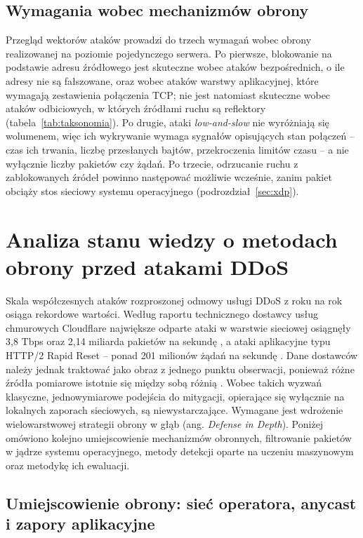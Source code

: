 \documentclass[a4paper,12pt]{article}
\begin{document}
\subsection{Wymagania wobec mechanizmów obrony}
Przegląd wektorów ataków prowadzi do trzech wymagań wobec obrony realizowanej na poziomie pojedynczego serwera. Po pierwsze, blokowanie na podstawie adresu źródłowego jest skuteczne wobec ataków bezpośrednich, o ile adresy nie są fałszowane, oraz wobec ataków warstwy aplikacyjnej, które wymagają zestawienia połączenia TCP; nie jest natomiast skuteczne wobec ataków odbiciowych, w których źródłami ruchu są reflektory (tabela~\ref{tab:taksonomia}). Po drugie, ataki \textit{low-and-slow} nie wyróżniają się wolumenem, więc ich wykrywanie wymaga sygnałów opisujących stan połączeń -- czas ich trwania, liczbę przesłanych bajtów, przekroczenia limitów czasu -- a nie wyłącznie liczby pakietów czy żądań. Po trzecie, odrzucanie ruchu z zablokowanych źródeł powinno następować możliwie wcześnie, zanim pakiet obciąży stos sieciowy systemu operacyjnego (podrozdział~\ref{sec:xdp}).

\section{Analiza stanu wiedzy o metodach obrony przed atakami DDoS}\label{sec:stan_obrona}
Skala współczesnych ataków rozproszonej odmowy usługi DDoS z roku na rok osiąga rekordowe wartości. Według raportu technicznego dostawcy usług chmurowych Cloudflare największe odparte ataki w warstwie sieciowej osiągnęły 3,8 Tbps oraz 2,14 miliarda pakietów na sekundę \cite{arora2024tbps}, a ataki aplikacyjne typu HTTP/2 Rapid Reset -- ponad 201 milionów żądań na sekundę \cite{pardue2023rapidreset}. Dane dostawców należy jednak traktować jako obraz z jednego punktu obserwacji, ponieważ różne źródła pomiarowe istotnie się między sobą różnią \cite{hiesgen2024age}. Wobec takich wyzwań klasyczne, jednowymiarowe podejścia do mitygacji, opierające się wyłącznie na lokalnych zaporach sieciowych, są niewystarczające. Wymagane jest wdrożenie wielowarstwowej strategii obrony w głąb (ang. \textit{Defense in Depth}). Poniżej omówiono kolejno umiejscowienie mechanizmów obronnych, filtrowanie pakietów w jądrze systemu operacyjnego, metody detekcji oparte na uczeniu maszynowym oraz metodykę ich ewaluacji.

\subsection{Umiejscowienie obrony: sieć operatora, anycast i zapory aplikacyjne}\label{sec:umiejscowienie}
\end{document}
